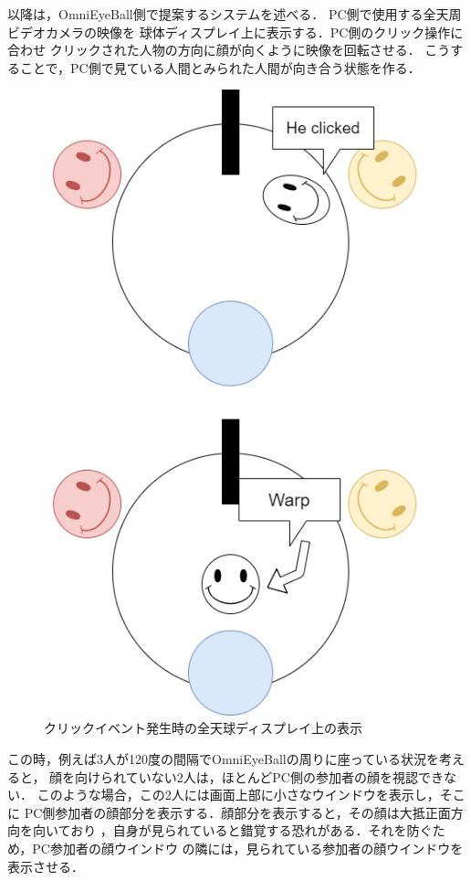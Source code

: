 以降は，OmniEyeBall側で提案するシステムを述べる．
PC側で使用する全天周ビデオカメラの映像を
球体ディスプレイ上に表示する．PC側のクリック操作に合わせ
クリックされた人物の方向に顔が向くように映像を回転させる．
こうすることで，PC側で見ている人間とみられた人間が向き合う状態を作る．

\begin{figure}[tp]
  \centering
  \includegraphics[scale=0.6]{fig/OEBsideSlideimg.png}
  \caption{クリックイベント発生時の全天球ディスプレイ上の表示}
\end{figure}

この時，例えば3人が120度の間隔でOmniEyeBallの周りに座っている状況を考えると，
顔を向けられていない2人は，ほとんどPC側の参加者の顔を視認できない．
このような場合，この2人には画面上部に小さなウインドウを表示し，そこに
PC側参加者の顔部分を表示する．顔部分を表示すると，その顔は大抵正面方向を向いており
，自身が見られていると錯覚する恐れがある．それを防ぐため，PC参加者の顔ウインドウ
の隣には，見られている参加者の顔ウインドウを表示させる．

